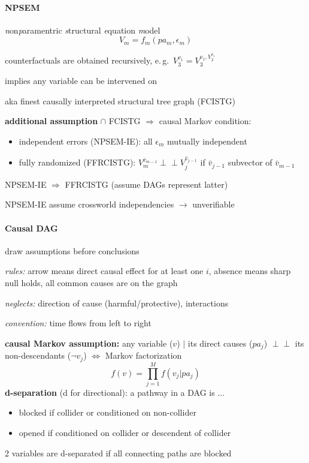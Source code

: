 \documentclass[8pt,twoside]{extarticle}
\newcommand{\indep}{\perp \!\!\! \perp}
\begin{document}
\begin{multicols}{2}
\paragraph{NPSEM} \textit{n}on\textit{p}aramentric \textit{s}tructural \textit{e}quation \textit{m}odel
$$V_m = f_m(pa_m, \epsilon_m)$$

 counterfactuals are obtained recursively, e.\,g.\  $V_3^{v_1} = V_3^{v_1, V_2^{v_1}}$

 implies any variable can be intervened on

 aka finest causally interpreted structural tree graph (FCISTG)

 \textbf{additional assumption} $\cap$ FCISTG $\Rightarrow$ causal Markov condition:
\begin{itemize}[itemsep=0em, topsep=0pt, partopsep=0pt,parsep=0pt, leftmargin=1.5em]
\setlength{\itemsep}{0pt}%
\setlength{\parskip}{0pt}
\item independent errors (NPSEM-IE): all $\epsilon_m$ mutually independent
\item fully randomized (FFRCISTG):  $V_m^{\bar{v}_{m-1}} \indep V_j^{\bar{v}_{j-1}}$ if $\bar{v}_{j-1}$ subvector of $\bar{v}_{m-1}$
\end{itemize}

 NPSEM-IE $\Rightarrow$ FFRCISTG (assume DAGs represent latter)

 NPSEM-IE assume crossworld independencies $\to$ unverifiable


\paragraph{Causal DAG} draw assumptions before conclusions


 \textit{rules:}
arrow means direct causal effect for at least one $i$, absence means sharp null holds, all common causes are on the graph


 \textit{neglects:} direction of cause (harmful/protective), interactions

 \textit{convention:} time flows from left to right


 \textbf{causal Markov assumption:} any variable ($v$) $|$ its direct causes ($pa_j$) $\indep$ its non-descendants ($\lnot v_j$) $\Leftrightarrow$ Markov factorization $$f(v) = \textstyle\prod_{j=1}^Mf(v_j|pa_j)$$
 \textbf{d-separation} (d for directional): a pathway in a DAG is ...
\begin{itemize}[itemsep=0em, topsep=0pt, partopsep=0pt,parsep=0pt, leftmargin=1.5em]
\setlength{\itemsep}{0pt}%
\setlength{\parskip}{0pt}
\item blocked if collider or conditioned on non-collider
\item opened if conditioned on collider or descendent of collider
\end{itemize}
2 variables are d-separated if all connecting paths are blocked


\end{multicols}
\end{document}
